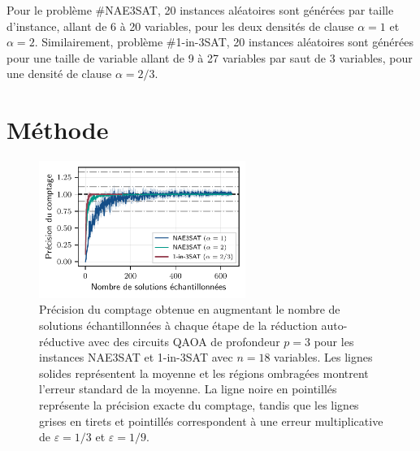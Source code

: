 Pour le problème \#NAE3SAT, 20 instances aléatoires sont générées par taille d'instance, allant de 6 à 20 variables, pour les deux densités de clause $\alpha=1$ et $\alpha = 2$. Similairement, problème \#1-in-3SAT, 20 instances aléatoires sont générées pour une taille de variable allant de 9 à 27 variables par saut de 3 variables, pour une densité de clause $\alpha = 2/3$. 


\section{Méthode}
\label{sec:methode}

\begin{figure}[H]
    \centering
    \includegraphics[width=0.6\textwidth]{figures/count-accuracy.pdf}
    \caption[Précision du comptage pour des problèmes \textsf{\#P}-difficile]{Précision du comptage obtenue en augmentant le nombre de solutions échantillonnées à chaque étape de la réduction auto-réductive avec des circuits QAOA de profondeur $p=3$ pour les instances NAE3SAT et 1-in-3SAT avec $n=18$ variables. Les lignes solides représentent la moyenne et les régions ombragées montrent l'erreur standard de la moyenne. La ligne noire en pointillés représente la précision exacte du comptage, tandis que les lignes grises en tirets et pointillés correspondent à une erreur multiplicative de $\varepsilon = 1/3$ et $\varepsilon = 1/9$.}
    \label{fig:count-accuracy.pdf}
\end{figure}

